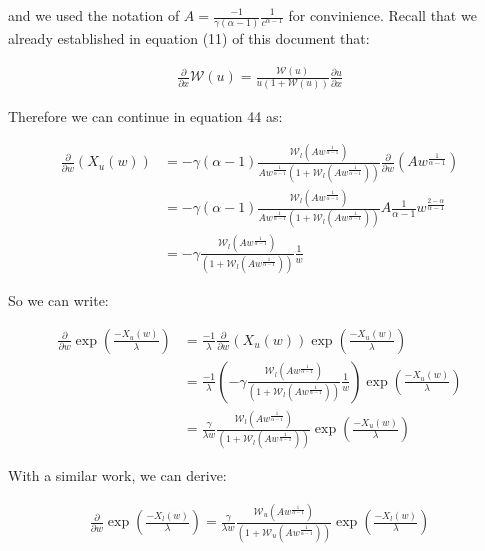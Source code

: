 \documentclass{article}
\newcommand{\sW}{\mathscr{W}}
\begin{document}
and we used the notation of $A = \frac{-1}{\gamma (\alpha-1)} \frac{1}{c^{\alpha-1}}$ for convinience. Recall that we already established in equation (11) of this document that:

\begin{align}
\frac{\partial}{\partial x} \sW(u) = \frac{\sW(u)}{ u (1+\sW(u)) } \frac{\partial u}{\partial x}
\end{align}
    
Therefore we can continue in equation 44 as:

\begin{align}
\frac{\partial}{\partial w}(X_{u}(w)) &= -\gamma (\alpha-1) \frac{\sW_l(A w^{ \frac{1}{\alpha-1} })}{ A w^{\frac{1}{\alpha-1}} \left( 1 + \sW_l(A w^{ \frac{1}{\alpha-1} }) \right) } \frac{\partial}{\partial w}(A w^{\frac{1}{\alpha-1}}) \\
&= -\gamma (\alpha-1) \frac{\sW_l(A w^{ \frac{1}{\alpha-1} })}{ A w^{\frac{1}{\alpha-1}} \left( 1 + \sW_l(A w^{ \frac{1}{\alpha-1} }) \right) } A \frac{1}{\alpha-1} w^{\frac{2-\alpha}{\alpha-1}} \\
&= -\gamma \frac{\sW_l(A w^{ \frac{1}{\alpha-1} })}{ \left( 1 + \sW_l(A w^{ \frac{1}{\alpha-1} }) \right)} \frac{1}{w}
\end{align}
        
So we can write: 

\begin{align}
\frac{\partial}{\partial w} \exp \left( \frac{-X_{u}(w)}{\lambda} \right) &= \frac{-1}{\lambda} \frac{\partial}{\partial w}(X_{u}(w)) \exp(\frac{-X_{u}(w)}{\lambda}) \\
&= \frac{-1}{\lambda} \left( -\gamma \frac{\sW_l(A w^{ \frac{1}{\alpha-1} })}{ \left( 1 + \sW_l(A w^{ \frac{1}{\alpha-1} }) \right)} \frac{1}{w} \right) \exp(\frac{-X_{u}(w)}{\lambda}) \\
&= \frac{\gamma}{\lambda w} \frac{\sW_l(A w^{ \frac{1}{\alpha-1} })}{ \left( 1 + \sW_l(A w^{ \frac{1}{\alpha-1} }) \right)} \exp(\frac{-X_{u}(w)}{\lambda}) 
\end{align}
    
With a similar work, we can derive:

\begin{align}
\frac{\partial}{\partial w} \exp \left( \frac{-X_{l}(w)}{\lambda} \right) = \frac{\gamma}{\lambda w} \frac{\sW_u(A w^{ \frac{1}{\alpha-1} })}{ \left( 1 + \sW_u(A w^{ \frac{1}{\alpha-1} }) \right)} \exp(\frac{-X_{l}(w)}{\lambda}) 
\end{align}
   
\end{document}
